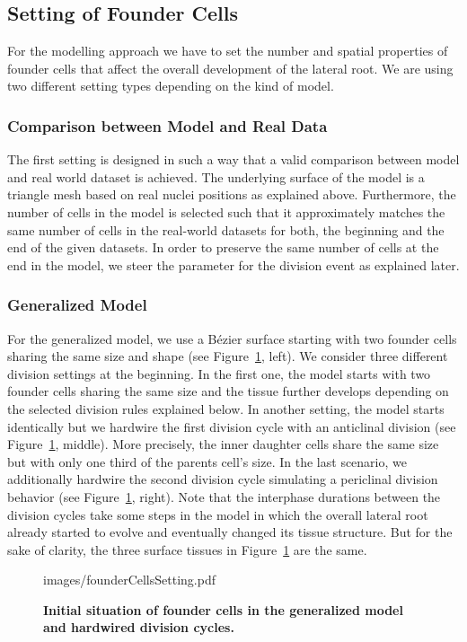 \documentclass[11pt,a4paper, draft]{article}
\begin{document}
\subsection{Setting of Founder Cells}
\noindent
For the modelling approach we have to set the number and spatial properties of founder cells that affect the overall development of the lateral root. We are using two different setting types depending on the kind of model.

\subsubsection{Comparison between Model and Real Data}
\noindent
The first setting is designed in such a way that a valid comparison between model and real world dataset is achieved. The underlying surface of the model is a triangle mesh based on real nuclei positions as explained above. Furthermore, the number of cells in the model is selected such that it approximately matches the same number of cells in the real-world datasets for both, the beginning and the end of the given datasets. In order to preserve the same number of cells at the end in the model, we steer the parameter for the division event as explained later.

\subsubsection{Generalized Model}
\noindent
For the generalized model, we use a B\'ezier surface starting with two founder cells sharing the same size and shape (see Figure~\ref{fig:founderCellsSetting}, left). We consider three different division settings at the beginning. In the first one, the model starts with two founder cells sharing the same size and the tissue further develops depending on the selected division rules explained below. In another setting, the model starts identically but we hardwire the first division cycle with an anticlinal division (see Figure~\ref{fig:founderCellsSetting}, middle). More precisely, the inner daughter cells share the same size but with only one third of the parents cell's size. In the last scenario, we additionally hardwire the second division cycle simulating a periclinal division behavior (see Figure~\ref{fig:founderCellsSetting}, right). Note that the interphase durations between the division cycles take some steps in the model in which the overall lateral root already started to evolve and eventually changed its tissue structure. But for the sake of clarity, the three surface tissues in Figure~\ref{fig:founderCellsSetting} are the same.
%
\begin{figure}[htbp]
	\begin{center}
		\begin{overpic}[width=1.\linewidth]{images/founderCellsSetting.pdf}
		\end{overpic}
\caption[Initial situation of founder cells in the generalized model and hardwired division cycles.]
{
{\bf Initial situation of founder cells in the generalized model and hardwired division cycles.}
}
	\label{fig:founderCellsSetting}
	\end{center}
\end{figure}
%
\end{document}
